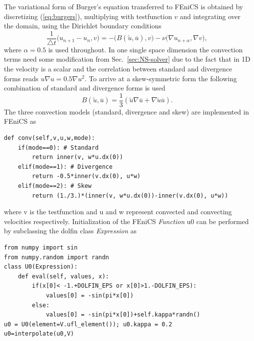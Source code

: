 
The variational form of Burger's equation transferred to FEniCS is obtained by discretizing (\ref{eq:burgers}), multiplying with testfunction $v$ and integrating over the domain, using the Dirichlet boundary conditions
\begin{equation}
 \frac{1}{\triangle t}\bigl( u_{n+1} - u_{n} , v\bigr) = - \bigl(B(\tilde{u},\overline{u}), v \bigr) - \nu \bigl( \nabla u_{n+\alpha}, \nabla v \bigr),
\label{eq:burgers_vf}
\end{equation}
where $\alpha=0.5$ is used throughout. In one single space dimension the convection terms need some modification from Sec.~\ref{sec:NS-solver} due to the fact that in 1D the velocity is a scalar and the correlation between standard and divergence forms reads $u\nabla u =0.5 \nabla u^2$. To arrive at a skew-symmetric form the following combination of standard and divergence forms is used
\begin{equation}
 B(\tilde{u},\overline{u}) = \frac{1}{3}\left( \tilde{u}\nabla \overline{u} + \nabla \tilde{u} \overline{u} \right).
\end{equation}
The three convection models (standard, divergence and skew) are implemented in FEniCS as
\begin{small}
\begin{verbatim}
def conv(self,v,u,w,mode):
    if(mode==0): # Standard
        return inner(v, w*u.dx(0))
    elif(mode==1): # Divergence
        return -0.5*inner(v.dx(0), u*w)
    elif(mode==2): # Skew
        return (1./3.)*(inner(v, w*u.dx(0))-inner(v.dx(0), u*w))
\end{verbatim}
\end{small}
where v is the testfunction and u and w represent convected and convecting velocities respectively. Initialization of the FEniCS \emph{Function} u0 can be performed by subclassing the dolfin class \emph{Expression} as
\begin{small}
\begin{verbatim}
from numpy import sin
from numpy.random import randn
class U0(Expression):
    def eval(self, values, x):
        if(x[0]< -1.+DOLFIN_EPS or x[0]>1.-DOLFIN_EPS):
            values[0] = -sin(pi*x[0])
        else:
            values[0] = -sin(pi*x[0])+self.kappa*randn()
u0 = U0(element=V.ufl_element()); u0.kappa = 0.2
u0=interpolate(u0,V)
\end{verbatim}
\end{small}
